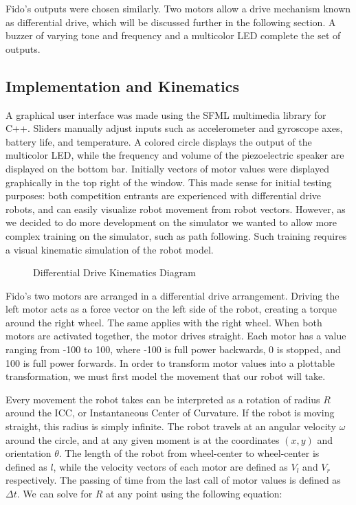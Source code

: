 Fido's outputs were chosen similarly.  Two motors allow a drive mechanism known as differential drive, which will be discussed further in the following section.  A buzzer of varying tone and frequency and a multicolor LED complete the set of outputs.  

\subsection{Implementation and Kinematics}

A graphical user interface was made using the SFML multimedia library for C++.  Sliders manually adjust inputs such as accelerometer and gyroscope axes, battery life, and temperature.  A colored circle displays the output of the multicolor LED, while the frequency and volume of the piezoelectric speaker are displayed on the bottom bar.   Initially vectors of motor values were displayed graphically in the top right of the window.  This made sense for initial testing purposes: both competition entrants are experienced with differential drive robots, and can easily visualize robot movement from robot vectors.  However, as we decided to do more development on the simulator we wanted to allow more complex training on the simulator, such as path following.  Such training requires a visual kinematic simulation of the robot model.

\begin{figure}[ht]
	\centering
	
	\caption{Differential Drive Kinematics Diagram}
\end{figure}

Fido's two motors are arranged in a differential drive arrangement.  Driving the left motor acts as a force vector on the left side of the robot, creating a torque around the right wheel.  The same applies with the right wheel.  When both motors are activated together, the motor drives straight.  Each motor has a value ranging from -100 to 100, where -100 is full power backwards, 0 is stopped, and 100 is full power forwards.   In order to transform motor values into a plottable transformation, we must first model the movement that our robot will take.

Every movement the robot takes can be interpreted as a rotation of radius $R$ around the ICC, or Instantaneous Center of Curvature.  If the robot is moving straight, this radius is simply infinite.   The robot travels at an angular velocity $\omega$ around the circle, and at any given moment is at the coordinates $(x,y)$ and orientation $\theta$.  The length of the robot from wheel-center to wheel-center is defined as $l$, while the velocity vectors of each motor are defined as $V_l$ and $V_r$ respectively.  The passing of time from the last call of motor values is defined as $\Delta t$.  We can solve for $R$ at any point using the following equation:

